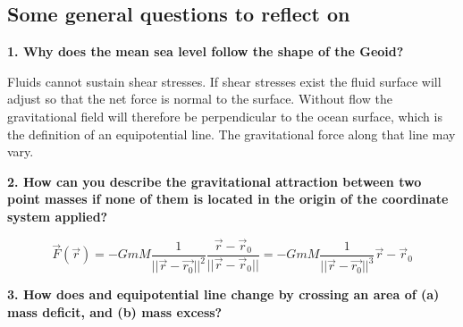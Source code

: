 \subsection{Some general questions to reflect on}
\textbf{1. Why does the mean sea level follow the shape of the Geoid?}
\ifanswers
  \begin{tcolorbox}[enhanced jigsaw,breakable,pad at break*=1mm,
    colback=blue!5!white,colframe=babyblueeyes,title=Solutions]
  Fluids cannot sustain shear stresses. If shear stresses exist the fluid surface will adjust so that the net force is normal to the surface. Without flow the gravitational field will therefore be perpendicular to the ocean surface, which is the definition of an equipotential line. The gravitational force along that line may vary.
  \end{tcolorbox}
\fi
\textbf{2. How can you describe the gravitational attraction between two point masses if none of them is located in the origin of the coordinate system applied?}
\ifanswers
  \begin{tcolorbox}[enhanced jigsaw,breakable,pad at break*=1mm,
    colback=blue!5!white,colframe=babyblueeyes,title=Solutions]
    $$
      \vec{F}(\vec{r}) = -GmM \frac{1}{||\vec{r}-\vec{r_0}||^2}\frac{\vec{r}-\vec{r}_0}{||\vec{r}-\vec{r}_0||}=-GmM \frac{1}{||\vec{r}-\vec{r_0}||^3}\vec{r}-\vec{r}_0
    $$
    \begin{center}
\end{center}
\end{tcolorbox}
\fi
\textbf{3. How does and equipotential line change by crossing an area of (a) mass deficit, and (b) mass excess?}
